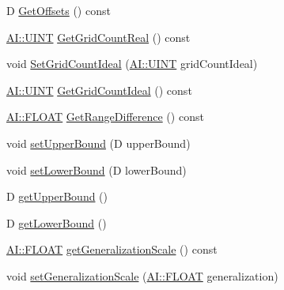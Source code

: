 \begin{DoxyCompactItemize}
\item 
D \hyperlink{classAI_1_1Algorithm_1_1DimensionInfo_a20db996bd27cf32c94fa1365546bde98}{Get\-Offsets} () const 
\item 
\hyperlink{namespaceAI_ab6e14dc1e659854858a87e511f1439ec}{A\-I\-::\-U\-I\-N\-T} \hyperlink{classAI_1_1Algorithm_1_1DimensionInfo_a06b80f631364311d2e731ea6646a2232}{Get\-Grid\-Count\-Real} () const 
\item 
void \hyperlink{classAI_1_1Algorithm_1_1DimensionInfo_a44578552f80f0772396bdc0430059e9e}{Set\-Grid\-Count\-Ideal} (\hyperlink{namespaceAI_ab6e14dc1e659854858a87e511f1439ec}{A\-I\-::\-U\-I\-N\-T} grid\-Count\-Ideal)
\item 
\hyperlink{namespaceAI_ab6e14dc1e659854858a87e511f1439ec}{A\-I\-::\-U\-I\-N\-T} \hyperlink{classAI_1_1Algorithm_1_1DimensionInfo_a6f6590d1d331c55ff424196a16232d94}{Get\-Grid\-Count\-Ideal} () const 
\item 
\hyperlink{namespaceAI_a41b74884a20833db653dded3918e05c3}{A\-I\-::\-F\-L\-O\-A\-T} \hyperlink{classAI_1_1Algorithm_1_1DimensionInfo_ac00dab53a32a43aca17dcb48d8109436}{Get\-Range\-Difference} () const 
\item 
void \hyperlink{classAI_1_1Algorithm_1_1DimensionInfo_a9889cad59dddd038f7fbddbd2ac6ece4}{set\-Upper\-Bound} (D upper\-Bound)
\item 
void \hyperlink{classAI_1_1Algorithm_1_1DimensionInfo_adef1b2721242ef4ca4978a1ceb8d2474}{set\-Lower\-Bound} (D lower\-Bound)
\item 
D \hyperlink{classAI_1_1Algorithm_1_1DimensionInfo_a01eab7ae14a0653b6042afc93ec988c5}{get\-Upper\-Bound} ()
\item 
D \hyperlink{classAI_1_1Algorithm_1_1DimensionInfo_a21bdf660f342425445db64a1dea1fc2f}{get\-Lower\-Bound} ()
\item 
\hyperlink{namespaceAI_a41b74884a20833db653dded3918e05c3}{A\-I\-::\-F\-L\-O\-A\-T} \hyperlink{classAI_1_1Algorithm_1_1DimensionInfo_a82de90c2830def513911e4a3135ac2e2}{get\-Generalization\-Scale} () const 
\item 
void \hyperlink{classAI_1_1Algorithm_1_1DimensionInfo_a53462f78d4d95d27ccb421f519b3112a}{set\-Generalization\-Scale} (\hyperlink{namespaceAI_a41b74884a20833db653dded3918e05c3}{A\-I\-::\-F\-L\-O\-A\-T} generalization)
\end{DoxyCompactItemize}



